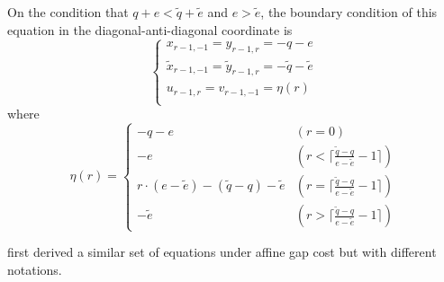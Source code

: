 \documentclass{bioinfo}
\begin{document}
\begin{methods}
On the condition that $q+e<\tilde{q}+\tilde{e}$ and $e>\tilde{e}$, the boundary
condition of this equation in the diagonal-anti-diagonal coordinate is
\[
\left\{\begin{array}{l}
x_{r-1,-1}=y_{r-1,r}=-q-e\\
\tilde{x}_{r-1,-1}=\tilde{y}_{r-1,r}=-\tilde{q}-\tilde{e}\\
u_{r-1,r}=v_{r-1,-1}=\eta(r)\\
\end{array}\right.
\]
where
\[
\eta(r)=\left\{\begin{array}{ll}
-q-e & (r=0) \\
-e & (r<\lceil\frac{\tilde{q}-q}{e-\tilde{e}}-1\rceil) \\
r\cdot(e-\tilde{e})-(\tilde{q}-q)-\tilde{e} & (r=\lceil\frac{\tilde{q}-q}{e-\tilde{e}}-1\rceil) \\
-\tilde{e} & (r>\lceil\frac{\tilde{q}-q}{e-\tilde{e}}-1\rceil)
\end{array}\right.
\]

\citet{Suzuki:2016} first derived a similar set of equations under affine gap
cost but with different notations.
\end{methods}
\end{document}
